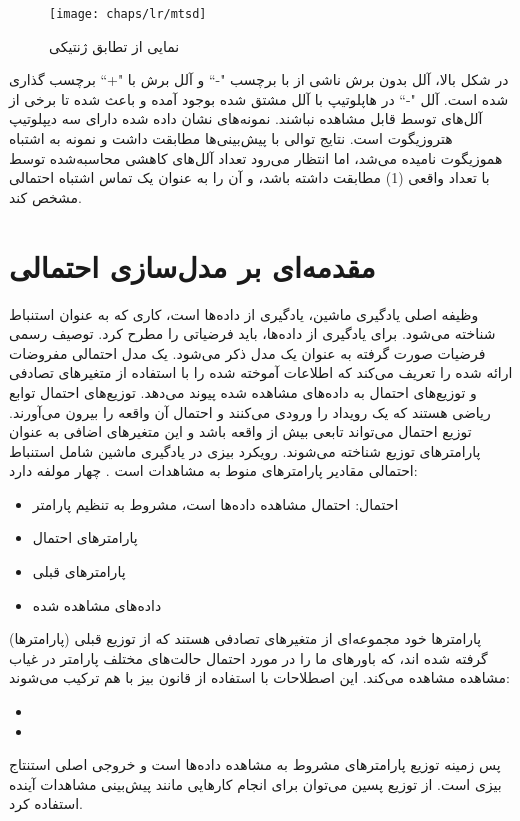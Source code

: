 \begin{figure}[!ht]
	\centerline{\texttt{[image: chaps/lr/mtsd]}}
	\caption{نمایی از تطابق ژنتیکی}
	\label{fig:ch_lr:mtsd}
\end{figure}

در شکل بالا، آلل  بدون برش ناشی از  با برچسب "-`` و آلل برش با "+`` برچسب گذاری شده است. آلل "-`` در هاپلوتیپ با آلل  مشتق شده بوجود آمده و باعث شده تا برخی از آلل‌های  توسط  قابل مشاهده نباشند. نمونه‌های نشان داده شده دارای سه دیپلوتیپ هتروزیگوت است. نتایج توالی با پیش‌بینی‌ها مطابقت داشت و نمونه  به اشتباه هموزیگوت نامیده می‌شد، اما انتظار می‌رود تعداد آلل‌های کاهشی محاسبه‌شده توسط  با تعداد واقعی (1) مطابقت داشته باشد، و آن را به عنوان یک تماس اشتباه احتمالی مشخص کند.

\section{مقدمه‌ای بر مدل‌سازی احتمالی }

وظیفه اصلی یادگیری ماشین، یادگیری از داده‌ها است، کاری که به عنوان استنباط شناخته می‌شود. برای یادگیری از داده‌ها، باید فرضیاتی را مطرح کرد. توصیف رسمی فرضیات صورت گرفته به عنوان یک مدل ذکر می‌شود. یک مدل احتمالی مفروضات ارائه شده را تعریف می‌کند که اطلاعات آموخته شده را با استفاده از متغیرهای تصادفی و توزیع‌های احتمال به داده‌های مشاهده شده پیوند می‌دهد. توزیع‌های احتمال توابع ریاضی هستند که یک رویداد را ورودی می‌کنند و احتمال آن واقعه را بیرون می‌آورند. توزیع احتمال می‌تواند تابعی بیش از واقعه باشد و این متغیرهای اضافی به عنوان پارامترهای توزیع شناخته می‌شوند\cite{hanahan2000hallmarks}. 
رویکرد بیزی در یادگیری ماشین شامل استنباط احتمالی مقادیر پارامترهای منوط به مشاهدات است \cite{hanahan2011hallmarks}. چهار مولفه دارد:

\begin{itemize}
	\item 	احتمال: احتمال مشاهده داده‌ها است، مشروط به تنظیم پارامتر  
	\item 	پارامترهای احتمال
	\item	پارامترهای قبلی 
	\item داده‌های مشاهده شده
\end{itemize}
پارامترها خود مجموعه‌ای از متغیرهای تصادفی هستند که از توزیع قبلی  (پارامترها) گرفته شده اند، که باورهای ما را در مورد احتمال حالت‌های مختلف پارامتر در غیاب مشاهده مشاهده می‌کند. این اصطلاحات با استفاده از قانون بیز با هم ترکیب می‌شوند:
\begin{itemize}
	\item {}
	\item {}
\end{itemize}
پس زمینه توزیع پارامترهای مشروط به مشاهده داده‌ها است و خروجی اصلی استنتاج بیزی است. از توزیع پسین می‌توان برای انجام کارهایی مانند پیش‌بینی مشاهدات آینده استفاده کرد.


